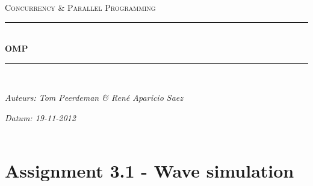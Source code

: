 \documentclass[a4paper]{article}
\newcommand{\HRule}{\rule{\linewidth}{0.5mm}}
\begin{document}
	\begin{titlepage}
	\begin{center}
		\textsc{\Large Concurrency \& Parallel Programming}\\[0.5cm]
		\HRule \\[0,4cm]
		\textsc{\huge \bfseries OMP}
		\HRule \\[8cm]
		\begin{minipage}{0.4\textwidth}
			\begin{flushleft}\large
				\emph{Auteurs: Tom Peerdeman \& Ren\'e Aparicio Saez}\\
			\end{flushleft}
		\end{minipage}
		\begin{minipage}{0.4\textwidth}
			\begin{flushright}\large
			\emph{Datum: 19-11-2012\\\hspace{1cm}}\\
			\end{flushright}
		\end{minipage}
	\end{center}
	\end{titlepage}

  \section{Assignment 3.1 - Wave simulation}
\end{document}
